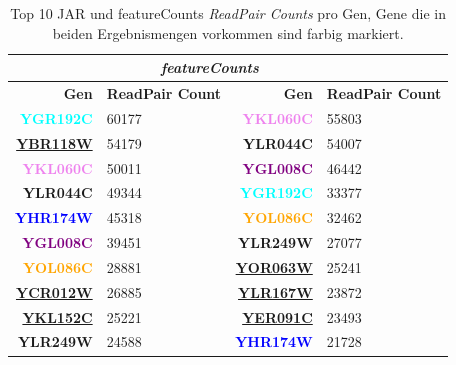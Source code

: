 \documentclass[12pt]{article}
\begin{document}
\begin{table}[htpb]
\centering
\renewcommand{\arraystretch}{1.2}
\setlength{\tabcolsep}{8pt}
\caption{Top 10 JAR und featureCounts \textit{ReadPair Counts} pro Gen, Gene die in beiden Ergebnismengen vorkommen sind farbig markiert.}
\label{tab:comp}
\begin{tabular}{|>{\bfseries}r|l|>{\bfseries}r|l|}
\hline
\rowcolor{gray!20} \multicolumn{2}{|c|}{\textit{JAR}} & \multicolumn{2}{c|}{\textit{featureCounts}} \\
\hline
\textbf{Gen} & \textbf{ReadPair Count} & \textbf{Gen} & \textbf{ReadPair Count} \\
\hline
\textcolor{cyan}{YGR192C} & 60177 & \textcolor{violet}{YKL060C} & 55803 \\
\underline{YBR118W}                  & 54179 & \textcolor{pink!90}{YLR044C} & 54007 \\
\textcolor{violet}{YKL060C} & 50011 & \textcolor{purple}{YGL008C} & 46442 \\
\textcolor{pink!90}{YLR044C} & 49344 & \textcolor{cyan}{YGR192C}                 & 33377 \\
\textcolor{blue}{YHR174W} & 45318 & \textcolor{orange}{YOL086C} & 32462 \\
\textcolor{purple}{YGL008C} & 39451 & \textcolor{blue!40}{YLR249W} & 27077 \\
\textcolor{orange}{YOL086C} & 28881 & \underline{YOR063W}                 & 25241 \\
\underline{YCR012W}                  & 26885 & \underline{YLR167W}                 & 23872 \\
    \underline{YKL152C}  & 25221 & \underline{YER091C}                 & 23493 \\
\textcolor{blue!40}{YLR249W} & 24588 & \textcolor{blue}{YHR174W} & 21728 \\
\hline
\end{tabular}
\end{table}







\newpage
\printbibliography


\end{document}
